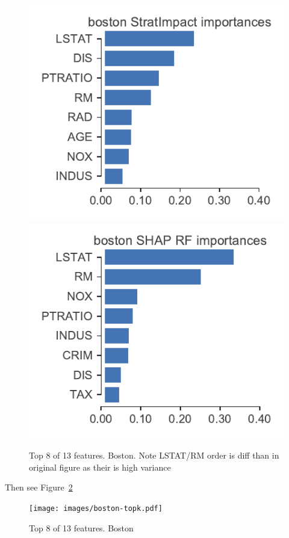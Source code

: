 \documentclass[12pt]{article}
\newcommand{\figref}[1]{Figure~\ref{#1}}
\begin{document}
\begin{figure}[htbp]
\begin{center}
\includegraphics[scale=0.6]{images/boston-features.pdf}
\includegraphics[scale=0.6]{images/boston-features-shap-rf.pdf}
\caption{Top 8 of 13 features. Boston. Note LSTAT/RM order is diff than in original figure as their is high variance}
\label{fig:boston-features}
\end{center}
\end{figure}

Then see \figref{fig:boston-topk}

\begin{figure}[htbp]
\begin{center}
\texttt{[image: images/boston-topk.pdf]}
\caption{Top 8 of 13 features. Boston}
\label{fig:boston-topk}
\end{center}
\end{figure}
\end{document}

